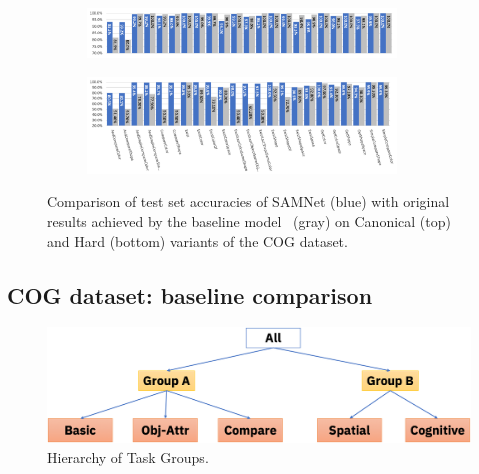 \begin{figure}[htbp]
	\centering
	\begin{subfigure}{\textwidth}
		\centering
		\includegraphics[width=0.9\textwidth]{../results/samnet_cog_orig_canonical_no_labels.png}
	\end{subfigure}%
	\newline
	\begin{subfigure}{\textwidth}
		\centering
		\includegraphics[width=0.9\textwidth]{../results/samnet_cog_orig_hard.png}
	\end{subfigure}%
	\caption{Comparison of test set accuracies of SAMNet (blue) with original results achieved by the
		baseline model~\cite{yang2018dataset} (gray) on Canonical (top) and Hard (bottom) variants of the COG dataset.}
	\label{fig:samnet_cog_detailed}
\end{figure}

\newpage
\subsection{COG dataset: baseline comparison}



\begin{figure}[htbp]
	\centering
	\includegraphics[width=\columnwidth]{../img/architecture/hierarchy}
	\caption{Hierarchy of Task Groups.}
	\label{fig:task-groups}
\end{figure}

